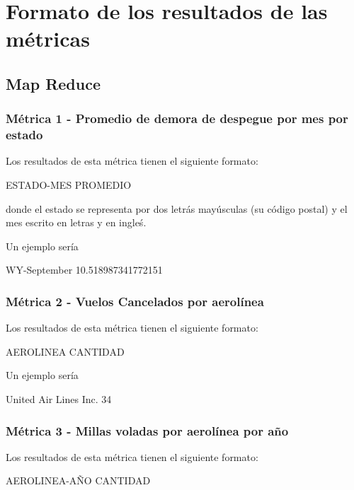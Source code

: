 \documentclass[a4paper,10pt]{article}
\begin{document}
\section{Formato de los resultados de las métricas}

    \subsection{Map Reduce}
        \subsubsection{Métrica 1 - Promedio de demora de despegue por mes por estado}
            Los resultados de esta métrica tienen el siguiente formato:\\
            \begin{center}
                ESTADO-MES PROMEDIO \\
            \end{center}
            donde el estado se representa por dos letrás mayúsculas (su código postal) y el mes escrito en letras y en ingleś.

            Un ejemplo sería\\
            \begin{center}
                WY-September    10.518987341772151\\
            \end{center}

        \subsubsection{Métrica 2 - Vuelos Cancelados por aerolínea}
            Los resultados de esta métrica tienen el siguiente formato:\\
            \begin{center}
                AEROLINEA CANTIDAD\\
            \end{center}

            Un ejemplo sería\\
            \begin{center}
               United Air Lines Inc.   34\\
            \end{center}

        \subsubsection{Métrica 3 - Millas voladas por aerolínea por año}
            Los resultados de esta métrica tienen el siguiente formato:\\
            \begin{center}
                AEROLINEA-AÑO CANTIDAD\\
            \end{center}
\end{document}
